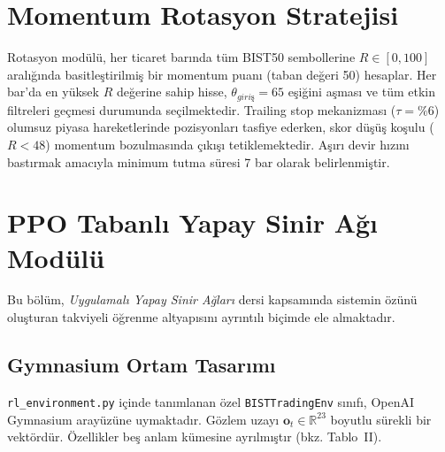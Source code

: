 \documentclass[journal]{IEEEtran}
\begin{document}
\section{Momentum Rotasyon Stratejisi}

Rotasyon modülü, her ticaret barında tüm BIST50 sembollerine
$R \in [0,100]$ aralığında basitleştirilmiş bir momentum puanı
(taban değeri 50) hesaplar. Her bar'da en yüksek $R$ değerine sahip
hisse, $\theta_{giriş} = 65$ eşiğini aşması ve tüm etkin filtreleri
geçmesi durumunda seçilmektedir. Trailing stop mekanizması
($\tau = \%6$) olumsuz piyasa hareketlerinde pozisyonları tasfiye
ederken, skor düşüş koşulu ($R < 48$) momentum bozulmasında çıkışı
tetiklemektedir. Aşırı devir hızını bastırmak amacıyla minimum
tutma süresi 7 bar olarak belirlenmiştir.

\section{PPO Tabanlı Yapay Sinir Ağı Modülü}

Bu bölüm, \textit{Uygulamalı Yapay Sinir Ağları} dersi kapsamında
sistemin özünü oluşturan takviyeli öğrenme altyapısını ayrıntılı
biçimde ele almaktadır.

\subsection{Gymnasium Ortam Tasarımı}

\texttt{rl\_environment.py} içinde tanımlanan özel
\texttt{BISTTradingEnv} sınıfı, OpenAI Gymnasium arayüzüne uymaktadır.
Gözlem uzayı $\mathbf{o}_t \in \mathbb{R}^{23}$ boyutlu sürekli bir
vektördür. Özellikler beş anlam kümesine ayrılmıştır (bkz. Tablo~II).
\end{document}
